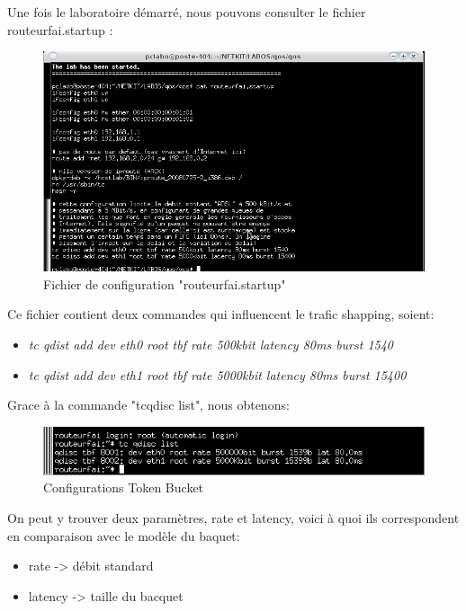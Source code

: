 \documentclass{article}
\begin{document}

\newpage
Une fois le laboratoire démarré, nous pouvons consulter le fichier routeurfai.startup :
\begin{figure}[h]
  \centering
  \includegraphics[width=\linewidth]{./captures/2-RouteurfaiStartup.png}
  \caption{Fichier de configuration "routeurfai.startup"}
  \label{fig:token-bucket}
\end{figure}

Ce fichier contient deux commandes qui influencent le trafic shapping, soient:
\begin{itemize}
\item \textit{tc qdist add dev eth0 root tbf rate 500kbit latency 80ms burst 1540}
\item \textit{tc qdist add dev eth1 root tbf rate 5000kbit latency 80ms burst 15400}
\end{itemize}

Grace à la commande "tcqdisc list", nous obtenons: 
\begin{figure}[h]
  \centering
  \includegraphics[width=\linewidth]{./captures/3-TokenBucket.png}
  \caption{Configurations Token Bucket}
  \label{fig:token-bucket}
\end{figure}

On peut y trouver deux paramètres, rate et latency, voici à quoi ils correspondent en comparaison avec le modèle du baquet:
\begin{itemize}
\item rate -> débit standard
\item latency -> taille du bacquet
\end{itemize}
\end{document}
